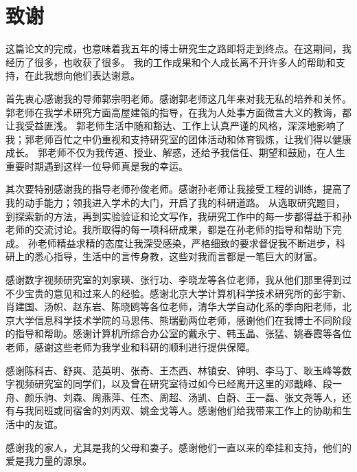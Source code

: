 \chapter{致谢}

这篇论文的完成，也意味着我五年的博士研究生之路即将走到终点。在这期间，我经历了很多，也收获了很多。
我的工作成果和个人成长离不开许多人的帮助和支持，在此我想向他们表达谢意。

首先衷心感谢我的导师郭宗明老师。感谢郭老师这几年来对我无私的培养和关怀。郭老师在我学术研究方面高屋建瓴的指导，在我为人处事方面微言大义的教诲，都让我受益匪浅。
郭老师生活中随和豁达、工作上认真严谨的风格，深深地影响了我；郭老师百忙之中仍重视和支持研究室的团体活动和体育锻炼，让我们得以健康成长。
郭老师不仅为我传道、授业、解惑，还给予我信任、期望和鼓励，在人生重要时期遇到这样一位导师真是我的幸运。

其次要特别感谢我的指导老师孙俊老师。感谢孙老师让我接受工程的训练，提高了我的动手能力；领我进入学术的大门，开启了我的科研道路。
从选取研究题目，到探索新的方法，再到实验验证和论文写作，我研究工作中的每一步都得益于和孙老师的交流讨论。我所取得的每一项科研成果，都是在孙老师的指导和帮助下完成。
孙老师精益求精的态度让我深受感染，严格细致的要求督促我不断进步，科研上的悉心指导，生活中的言传身教，这些对我而言都是一笔巨大的财富。

感谢数字视频研究室的刘家瑛、张行功、李晓龙等各位老师，我从他们那里得到过不少宝贵的意见和过来人的经验。感谢北京大学计算机科学技术研究所的彭宇新、肖建国、汤帜、赵东岩、陈晓鸥等各位老师，清华大学自动化系的季向阳老师，北京大学信息科学技术学院的马思伟、熊瑞勤两位老师，感谢他们在我博士不同阶段的指导和帮助。感谢计算机所综合办公室的戴永宁、韩玉晶、张猛、姚春霞等各位老师，感谢这些老师为我学业和科研的顺利进行提供保障。

感谢陈科吉、舒爽、范英明、张奇、王杰西、林镇安、钟明、李马丁、耿玉峰等数字视频研究室的同学们，以及曾在研究室待过如今已经离开这里的邓戬峰、段一舟、颜乐驹、刘森、周燕萍、任杰、周超、汤凯、白蔚、王一磊、张文尧等人，还有与我同班或同宿舍的刘丙双、姚金戈等人。感谢他们给我带来工作上的协助和生活中的友谊。

感谢我的家人，尤其是我的父母和妻子。感谢他们一直以来的牵挂和支持，他们的爱是我力量的源泉。